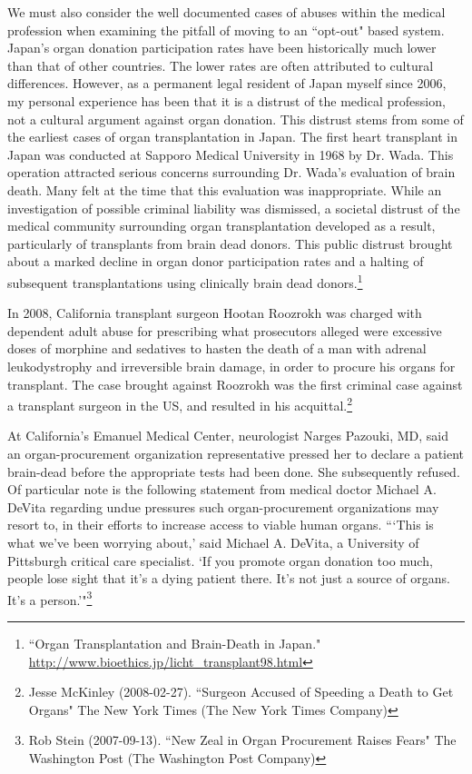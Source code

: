 \documentclass[letterpaper,10pt,twoside]{article}
\begin{document}
We must also consider the well documented cases of abuses within the medical profession when examining the pitfall of moving to an ``opt-out" based system.  Japan's organ donation participation rates have been historically much lower than that of other countries.  The lower rates are often attributed to cultural differences.  However, as a permanent legal resident of Japan myself since 2006, my personal experience has been that it is a distrust of the medical profession, not a cultural argument against organ donation.  This distrust stems from some of the earliest cases of organ transplantation in Japan.  The first heart transplant in Japan was conducted at Sapporo Medical University in 1968 by Dr. Wada.  This operation attracted serious concerns surrounding Dr. Wada's evaluation of brain death.  Many felt at the time that this evaluation was inappropriate. While an investigation of possible criminal liability was dismissed, a societal distrust of the medical community surrounding organ transplantation developed as a result, particularly of transplants from brain dead donors. This public distrust brought about a marked decline in organ donor participation rates and a halting of subsequent transplantations using clinically brain dead donors.\footnote{``Organ Transplantation and Brain-Death in Japan." \url{http://www.bioethics.jp/licht_transplant98.html}}

In 2008, California transplant surgeon Hootan Roozrokh was charged with dependent adult abuse for prescribing what prosecutors alleged were excessive doses of morphine and sedatives to hasten the death of a man with adrenal leukodystrophy and irreversible brain damage, in order to procure his organs for transplant. The case brought against Roozrokh was the first criminal case against a transplant surgeon in the US, and resulted in his acquittal.\footnote{Jesse McKinley (2008-02-27). ``Surgeon Accused of Speeding a Death to Get Organs" The New York Times (The New York Times Company)}

At California's Emanuel Medical Center, neurologist Narges Pazouki, MD, said an organ-procurement organization representative pressed her to declare a patient brain-dead before the appropriate tests had been done.  She subsequently refused.  Of particular note is the following statement from medical doctor Michael A. DeVita regarding undue pressures such organ-procurement organizations may resort to, in their efforts to increase access to viable human organs. ```This is what we've been worrying about,' said Michael A. DeVita, a University of Pittsburgh critical care specialist. `If you promote organ donation too much, people lose sight that it's a dying patient there. It's not just a source of organs. It's a person.'"\footnote{Rob Stein (2007-09-13). ``New Zeal in Organ Procurement Raises Fears" The Washington Post (The Washington Post Company)}
\end{document}
